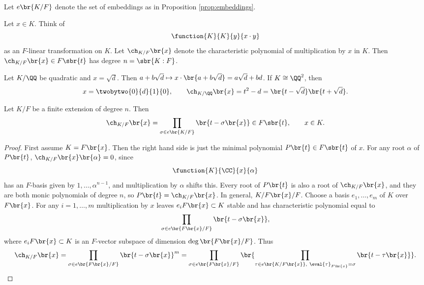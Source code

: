 \begin{notation*}
Let $ e\br{K / F} $ denote the set of embeddings as in Proposition \ref{prop:embeddings}.
\end{notation*}

Let $ x \in K $. Think of
$$ \function{K}{K}{y}{x \cdot y} $$
as an $ F $-linear transformation on $ K $. Let $ \ch_{K / F}\br{x} $ denote the characteristic polynomial of multiplication by $ x $ in $ K $. Then $ \ch_{K / F}\br{x} \in F\sbr{t} $ has degree $ n = \sbr{K : F} $.

\begin{example*}
Let $ K / \QQ $ be quadratic and $ x = \sqrt{d} $. Then $ a + b\sqrt{d} \mapsto x \cdot \br{a + b\sqrt{d}} = a\sqrt{d} + bd $. If $ K \cong \QQ^2 $, then
$$ x = \twobytwo{0}{d}{1}{0}, \qquad \ch_{K / \QQ}\br{x} = t^2 - d = \br{t - \sqrt{d}}\br{t + \sqrt{d}}. $$
\end{example*}

\begin{proposition}
Let $ K / F $ be a finite extension of degree $ n $. Then
$$ \ch_{K / F}\br{x} = \prod_{\sigma \in e\br{K / F}} \br{t - \sigma\br{x}} \in F\sbr{t}, \qquad x \in K. $$
\end{proposition}

\begin{proof}
First assume $ K = F\br{x} $. Then the right hand side is just the minimal polynomial $ P\br{t} \in F\sbr{t} $ of $ x $. For any root $ \alpha $ of $ P\br{t} $, $ \ch_{K / F}\br{x}\br{\alpha} = 0 $, since
$$ \function{K}{\CC}{x}{\alpha} $$
has an $ F $-basis given by $ 1, \dots, \alpha^{n - 1} $, and multiplication by $ \alpha $ shifts this. Every root of $ P\br{t} $ is also a root of $ \ch_{K / F}\br{x} $, and they are both monic polynomials of degree $ n $, so $ P\br{t} = \ch_{K / F}\br{x} $. In general, $ K / F\br{x} / F $. Choose a basis $ e_1, \dots, e_m $ of $ K $ over $ F\br{x} $. For any $ i = 1, \dots, m $ multiplication by $ x $ leaves $ e_iF\br{x} \subset K $ stable and has characteristic polynomial equal to
$$ \prod_{\sigma \in e\br{F\br{x} / F}} \br{t - \sigma\br{x}}, $$
where $ e_iF\br{x} \subset K $ is an $ F $-vector subspace of dimension $ \deg \br{F\br{x} / F} $. Thus
$$ \ch_{K / F}\br{x} = \prod_{\sigma \in e\br{F\br{x} / F}} \br{t - \sigma\br{x}}^m = \prod_{\sigma \in e\br{F\br{x} / F}} \br{\prod_{\tau \in e\br{K / F\br{x}}, \ \eval{\tau}_{F\br{x}} = \sigma} \br{t - \tau\br{x}}}. $$
\end{proof}

\pagebreak

